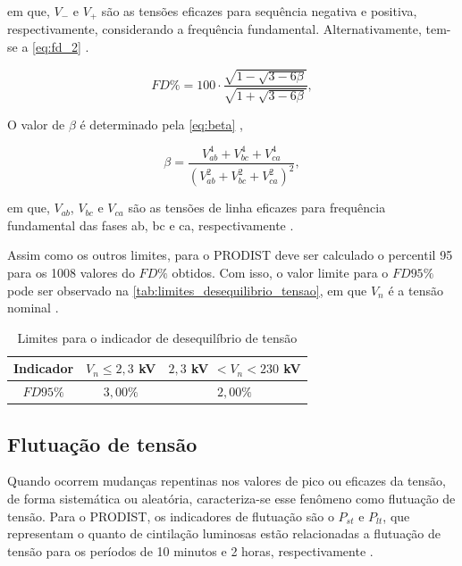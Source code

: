\noindent
em que, $V_-$ e $V_+$ são as tensões eficazes para sequência negativa e positiva, respectivamente, considerando a frequência fundamental. Alternativamente, tem-se a \autoref{eq:fd_2} \cite{ref:ANEEL2021}.

\begin{equation}
  FD\%=100 \cdot \frac{\sqrt{1-\sqrt{3-6 \beta}}}{\sqrt{1+\sqrt{3-6 \beta}}},
  \label{eq:fd_2}
\end{equation}

O valor de $\beta$ é determinado pela \autoref{eq:beta} \cite{ref:ANEEL2021},

\begin{equation}  
  \beta=\frac{V_{a b}^4+V_{b c}^4+V_{c a}^4}{\left(V_{a b}^2+V_{b c}^2+V_{c a}^2\right)^2},
  \label{eq:beta}
\end{equation}

\noindent
em que, $V_{ab}$, $V_{bc}$ e $V_{ca}$ são as tensões de linha eficazes para frequência fundamental das fases ab, bc e ca, respectivamente \cite{ref:ANEEL2021}.

Assim como os outros limites, para o PRODIST deve ser calculado o percentil 95 para os 1008 valores do $FD\%$ obtidos. Com isso, o valor limite para o $FD95\%$ pode ser observado na \autoref{tab:limites_desequilibrio_tensao}, em que $V_n$ é a tensão nominal \cite{ref:ANEEL2021}.

\begin{table}[H]
  \centering
  \caption{Limites para o indicador de desequilíbrio de tensão}
  \label{tab:limites_desequilibrio_tensao}
  \begin{tabular}{@{}ccc@{}}
  \toprule
  \textbf{Indicador} & \textbf{$V_n \leq  2,3$ kV} & \textbf{$2,3$ kV $< V_n  < 230$ kV} \\ \midrule
  $FD95\%$ & $3,00\%$ & $2,00\%$ \\ \bottomrule
  \end{tabular}
\end{table}

\subsection{Flutuação de tensão}

Quando ocorrem mudanças repentinas nos valores de pico ou eficazes da tensão, de forma sistemática ou aleatória, caracteriza-se esse fenômeno como flutuação de tensão. Para o PRODIST, os indicadores de flutuação são o $P_{st}$ e $P_{lt}$, que representam o quanto de cintilação luminosas estão relacionadas a flutuação de tensão para os períodos de 10 minutos e 2 horas, respectivamente \cite{ref:ANEEL2021}.

